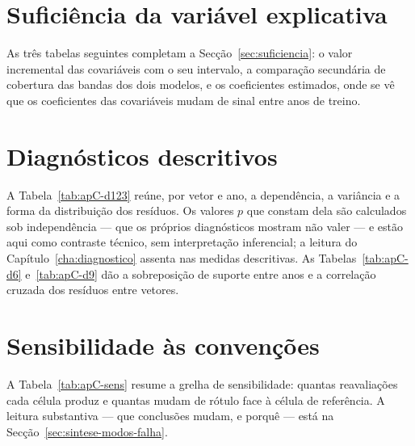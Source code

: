 




\section{Suficiência da variável explicativa}
\label{sec:apC-e6}

As três tabelas seguintes completam a Secção~\ref{sec:suficiencia}: o valor
incremental das covariáveis com o seu intervalo, a comparação secundária de
cobertura das bandas dos dois modelos, e os coeficientes estimados, onde se vê
que os coeficientes das covariáveis mudam de sinal entre anos de treino.





\section{Diagnósticos descritivos}
\label{sec:apC-descritivos}

A Tabela~\ref{tab:apC-d123} reúne, por vetor e ano, a dependência, a variância e
a forma da distribuição dos resíduos. Os valores $p$ que constam dela são
calculados sob independência --- que os próprios diagnósticos mostram não valer
--- e estão aqui como contraste técnico, sem interpretação inferencial; a
leitura do Capítulo~\ref{cha:diagnostico} assenta nas medidas descritivas. As
Tabelas~\ref{tab:apC-d6} e~\ref{tab:apC-d9} dão a sobreposição de suporte entre
anos e a correlação cruzada dos resíduos entre vetores.





\section{Sensibilidade às convenções}
\label{sec:apC-sens}

A Tabela~\ref{tab:apC-sens} resume a grelha de sensibilidade: quantas
reavaliações cada célula produz e quantas mudam de rótulo face à célula de
referência. A leitura substantiva --- que conclusões mudam, e porquê --- está
na Secção~\ref{sec:sintese-modos-falha}.


